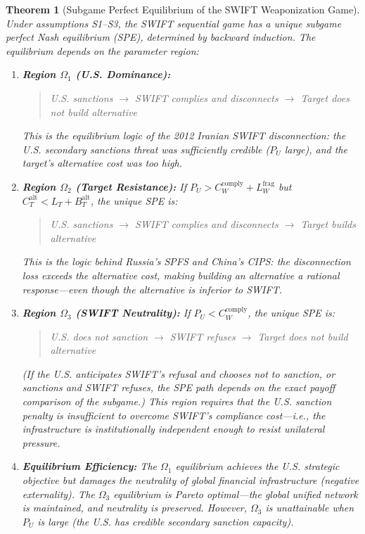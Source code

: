 \documentclass[12pt,a4paper]{article}
\newtheorem{theorem}{Theorem}[section]
\theoremstyle{definition}
\theoremstyle{remark}
\begin{document}
\begin{theorem}[Subgame Perfect Equilibrium of the SWIFT Weaponization Game]
\label{thm:swift-spe}
Under assumptions S1--S3, the SWIFT sequential game has a unique subgame perfect Nash equilibrium (SPE), determined by backward induction. The equilibrium depends on the parameter region:

\begin{enumerate}[label=(
oman*), itemsep=6pt]
\item \textbf{Region $\Omega_1$ (U.S. Dominance):}
\begin{quote}
U.S. sanctions $\to$ SWIFT complies and disconnects $\to$ Target does not build alternative
\end{quote}
This is the equilibrium logic of the 2012 Iranian SWIFT disconnection: the U.S. secondary sanctions threat was sufficiently credible ($P_U$ large), and the target's alternative cost was too high.

\item \textbf{Region $\Omega_2$ (Target Resistance):} If $P_U > C_W^{\text{comply}} + L_W^{\text{frag}}$ but $C_T^{\text{alt}} < L_T + B_T^{\text{alt}}$, the unique SPE is:
\begin{quote}
U.S. sanctions $\to$ SWIFT complies and disconnects $\to$ Target builds alternative
\end{quote}
This is the logic behind Russia's SPFS and China's CIPS: the disconnection loss exceeds the alternative cost, making building an alternative a rational response---even though the alternative is inferior to SWIFT.

\item \textbf{Region $\Omega_3$ (SWIFT Neutrality):} If $P_U < C_W^{\text{comply}}$, the unique SPE is:
\begin{quote}
U.S. does not sanction $\to$ SWIFT refuses $\to$ Target does not build alternative
\end{quote}
(If the U.S. anticipates SWIFT's refusal and chooses not to sanction, or sanctions and SWIFT refuses, the SPE path depends on the exact payoff comparison of the subgame.) This region requires that the U.S. sanction penalty is insufficient to overcome SWIFT's compliance cost---i.e., the infrastructure is institutionally independent enough to resist unilateral pressure.

\item \textbf{Equilibrium Efficiency:} The $\Omega_1$ equilibrium achieves the U.S. strategic objective but damages the neutrality of global financial infrastructure (negative externality). The $\Omega_3$ equilibrium is Pareto optimal---the global unified network is maintained, and neutrality is preserved. However, $\Omega_3$ is unattainable when $P_U$ is large (the U.S. has credible secondary sanction capacity).
\end{enumerate}
\end{theorem}
\end{document}
